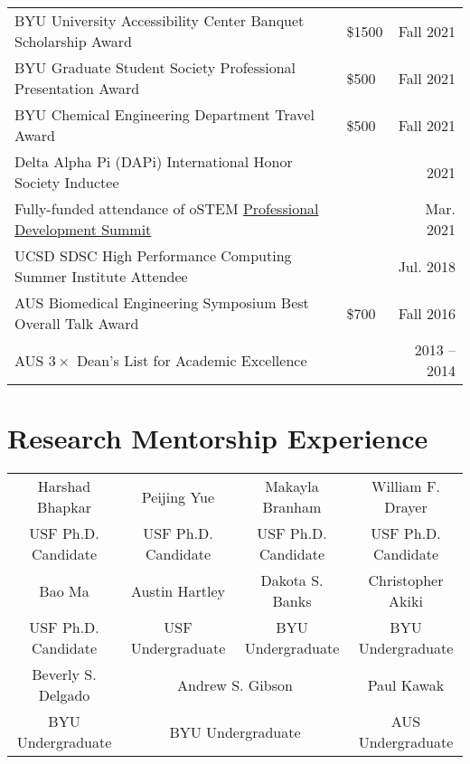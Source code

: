 \documentclass[letterpaper,11pt]{article}
\begin{document}
\begin{longtable}{@{}p{} p{} r@{}}
  BYU University Accessibility Center Banquet Scholarship Award              									& \$1500 & Fall 2021 \\[3.5pt] %
  BYU Graduate Student Society Professional Presentation Award               									& \$500 & Fall 2021 \\[3.5pt] %
  BYU Chemical Engineering Department Travel Award                           									& \$500 & Fall 2021 \\[3.5pt] %
  Delta Alpha Pi (DAPi) International Honor Society Inductee                 									& & 2021 \\[3.5pt]
  Fully-funded attendance of oSTEM \href{https://ostem.org/page/professional-development-summit}{Professional Development Summit}           	& & Mar. 2021 \\[3.5pt]
  UCSD SDSC High Performance Computing Summer Institute Attendee             									& & Jul. 2018 \\[3.5pt]
  AUS Biomedical Engineering Symposium Best Overall Talk Award               									& \$700 & Fall 2016 \\[3.5pt]
  AUS $3\times$ Dean's List for Academic Excellence                          									& & 2013 -- 2014 \\[3.5pt]
\end{longtable}
\vspace{3ex}

\vspace{-1.5\baselineskip}
\section*{Research Mentorship Experience}
\vspace{-0.5\baselineskip}
\begin{longtable}{ c c c c }
  Harshad Bhapkar 	& Peijing Yue 		& Makayla Branham 	& William F. Drayer 	\\
  USF Ph.D. Candidate   & USF Ph.D. Candidate 	& USF Ph.D. Candidate 	& USF Ph.D. Candidate 	\\[4pt]
  Bao Ma 		& Austin Hartley	& Dakota S. Banks 	& Christopher Akiki	\\
  USF Ph.D. Candidate 	& USF Undergraduate 	& BYU Undergraduate	& BYU Undergraduate	\\[4pt]
  Beverly S. Delgado 	& \multicolumn{2}{c}{Andrew S. Gibson} 		& Paul Kawak 		\\
  BYU Undergraduate	& \multicolumn{2}{c}{BYU Undergraduate}		& AUS Undergraduate 	\\[4pt]
\end{longtable}
\vspace{3ex}
\end{document}
